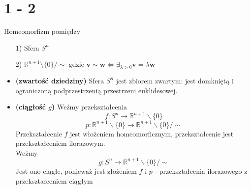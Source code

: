\section*{1 - 2}
Homeomorfizm pomiędzy
\begin{itemize}
  \item[1)] Sfera $S^n$
  \item[2)] $\mathbb{R} ^ {n+1} \setminus \{ 0 \} / \sim $ gdzie $ \mathbf{v} \sim  \mathbf{w} \iff \exists_{\lambda > 0}  \mathbf{v}=  \lambda \mathbf{w} $
\end{itemize}
\begin{itemize}

\item \textbf{(zwartość dziedziny)} Sfera $ S^n $ jest zbiorem zwartym: jest domkniętą i ograniczoną podprzestrzenią przestrzeni euklidesowej.\\

\item \textbf{(ciągłość $g$)} Weźmy przekształcenia
$$
f: S^n \rightarrow \mathbb{R}^{n+1} \backslash \{0\}
$$
$$
p: \mathbb{R}^{n+1} \backslash \{0\} \rightarrow \mathbb{R}^{n+1} \backslash \{0\} / \sim
$$
Przekształcenie $f$ jest włożeniem homeomorficznym, przekształcenie jest przekształceniem ilorazowym.
\\
Weźmy
$$ g: S^n \rightarrow \mathbb{R}^{n+1} \backslash \{0\} / \sim $$
Jest ono ciągłe, ponieważ jest złożeniem $f$ i $p$ - przekształcenia ilorazowego z przekształceniem ciągłym\\
\end{itemize}


